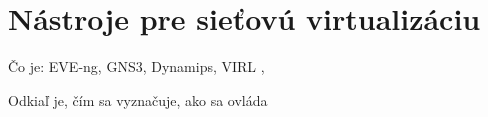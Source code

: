 \chapter{Nástroje pre sieťovú virtualizáciu}

Čo je:
EVE-ng, GNS3, Dynamips, VIRL \cite{pes2} \cite{bartsch2}, \cite{berman, wolfram}

Odkiaľ je, čím sa vyznačuje, ako sa ovláda